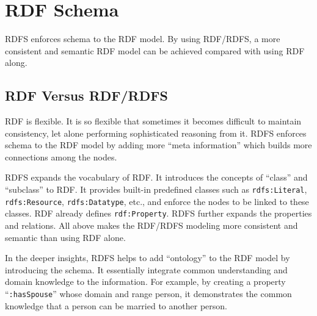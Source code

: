 \section{RDF Schema}

RDFS enforces schema to the RDF model. By using RDF/RDFS, a more consistent and semantic RDF model can be achieved compared with using RDF along.

\subsection{RDF Versus RDF/RDFS} \label{subsec:rdfvsrdfs}

RDF is flexible. It is so flexible that sometimes it becomes difficult to maintain consistency, let alone performing sophisticated reasoning from it. RDFS enforces schema to the RDF model by adding more ``meta information'' which builds more connections among the nodes.

RDFS expands the vocabulary of RDF. It introduces the concepts of ``class'' and ``subclass'' to RDF. It provides built-in predefined classes such as \verb|rdfs:Literal|, \verb|rdfs:Resource|, \verb|rdfs:Datatype|, etc., and enforce the nodes to be linked to these classes. RDF already defines \verb|rdf:Property|. RDFS further expands the properties and relations. All above makes the RDF/RDFS modeling more consistent and semantic than using RDF alone.

In the deeper insights, RDFS helps to add ``ontology'' to the RDF model by introducing the schema. It essentially integrate common understanding and domain knowledge to the information. For example, by creating a property ``\verb|:hasSpouse|'' whose domain and range person, it demonstrates the common knowledge that a person can be married to another person.

